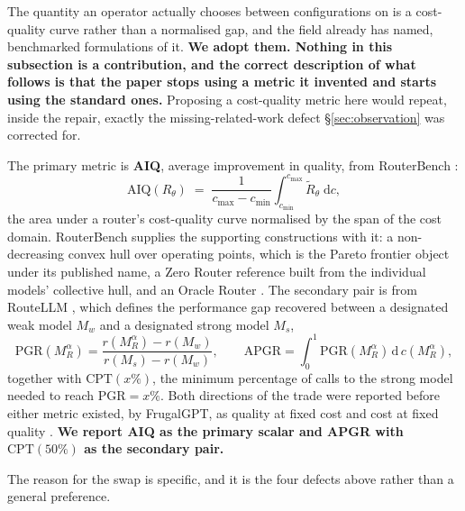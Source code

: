 \documentclass[11pt]{article}
\begin{document}
The quantity an operator actually chooses between configurations on is a cost-quality curve rather than a normalised gap, and the field already has named, benchmarked formulations of it. \textbf{We adopt them. Nothing in this subsection is a contribution, and the correct description of what follows is that the paper stops using a metric it invented and starts using the standard ones.} Proposing a cost-quality metric here would repeat, inside the repair, exactly the missing-related-work defect \S\ref{sec:observation} was corrected for.

The primary metric is \textbf{AIQ}, average improvement in quality, from RouterBench \cite{hu2024routerbench}:
\begin{equation}
\mathrm{AIQ}(R_\theta) \;=\; \frac{1}{c_{\max}-c_{\min}}\int_{c_{\min}}^{c_{\max}} \tilde{R}_\theta \;\mathrm{d}c ,
\label{eq:aiq}
\end{equation}
the area under a router's cost-quality curve normalised by the span of the cost domain. RouterBench supplies the supporting constructions with it: a non-decreasing convex hull over operating points, which is the Pareto frontier object under its published name, a Zero Router reference built from the individual models' collective hull, and an Oracle Router \cite{hu2024routerbench}. The secondary pair is from RouteLLM \cite{ong2024routellm}, which defines the performance gap recovered between a designated weak model $M_w$ and a designated strong model $M_s$,
\begin{equation}
\mathrm{PGR}(M_R^\alpha) = \frac{r(M_R^\alpha) - r(M_w)}{r(M_s) - r(M_w)},
\qquad
\mathrm{APGR} = \int_0^1 \mathrm{PGR}(M_R^\alpha)\,\mathrm{d}\,c(M_R^\alpha),
\label{eq:apgr}
\end{equation}
together with $\mathrm{CPT}(x\%)$, the minimum percentage of calls to the strong model needed to reach $\mathrm{PGR} = x\%$. Both directions of the trade were reported before either metric existed, by FrugalGPT, as quality at fixed cost and cost at fixed quality \cite{chen2023frugalgpt}. \textbf{We report AIQ as the primary scalar and APGR with $\mathrm{CPT}(50\%)$ as the secondary pair.}

The reason for the swap is specific, and it is the four defects above rather than a general preference.
\end{document}

